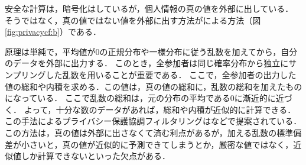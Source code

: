 安全な計算は，暗号化はしているが，個人情報の真の値を外部に出している．
そうではなく，真の値ではない値を外部に出す方法がによる方法（図\ref{fig:privacycf:b}）である．

原理は単純で，平均値が0の正規分布や一様分布に従う乱数を加えてから，自分のデータを外部に出力する．
このとき，全参加者は同じ確率分布から独立にサンプリングした乱数を用いることが重要である．
ここで，全参加者の出力した値の総和や内積を求める．この値は，真の値の総和に，乱数の総和を加えたものになっている．
ここで乱数の総和は，元の分布の平均である$0$に漸近的に近づく．
よって，十分な数のデータがあれば，総和や内積が近似的に計算できる．
この手法によるプライバシー保護協調フィルタリングは\cite{icdm:03:01}などで提案されている．
この方法は，真の値は外部に出さなくて済む利点があるが，加える乱数の標準偏差が小さいと，真の値が近似的に予測できてしまうとか，厳密な値ではなく，近似値しか計算できないといった欠点がある．
